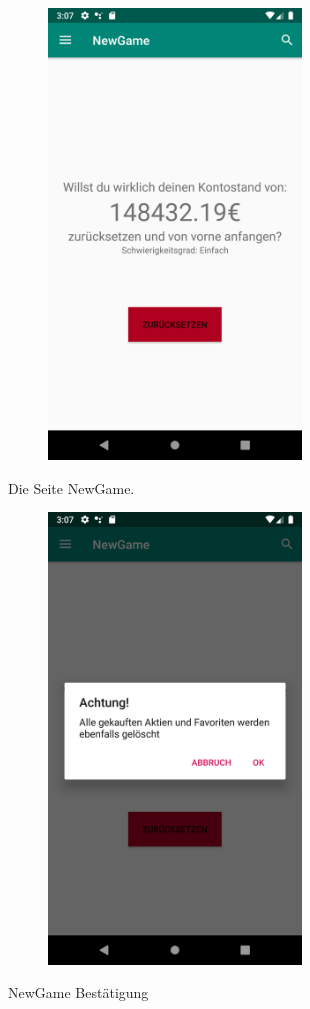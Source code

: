 \documentclass[10pt]{scrartcl}
\begin{document}
\begin{figure}[H]
	\centering
	\includegraphics[width=0.6\textwidth]{Bilder/Applikation/NewGame.png}
\end{figure}
Die Seite NewGame.

\begin{figure}[H]
	\centering
	\includegraphics[width=0.6\textwidth]{Bilder/Applikation/NewGameBestaetigung.png}
\end{figure}
NewGame Bestätigung
\end{document}
